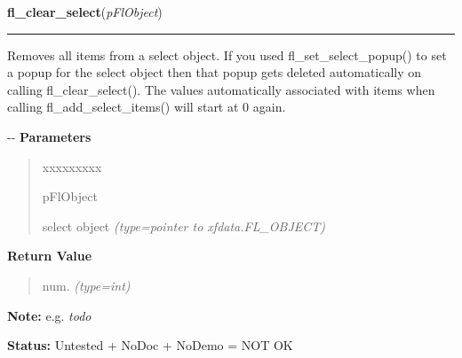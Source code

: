 \hspace{.8\funcindent}\begin{boxedminipage}{\funcwidth}

    \raggedright \textbf{fl\_clear\_select}(\textit{pFlObject})

    \vspace{-1.5ex}

    \rule{\textwidth}{0.5\fboxrule}
\setlength{\parskip}{2ex}

Removes all items from a select object. If you used
fl\_set\_select\_popup() to set a popup for the select object then that
popup gets deleted automatically on calling fl\_clear\_select(). The
values automatically associated with items when calling
fl\_add\_select\_items() will start at 0 again.

-{}-
\setlength{\parskip}{1ex}
      \textbf{Parameters}
      \vspace{-1ex}

      \begin{quote}
        \begin{Ventry}{xxxxxxxxx}

          \item[pFlObject]


select object
            {\it (type=pointer to xfdata.FL\_OBJECT)}

        \end{Ventry}

      \end{quote}

      \textbf{Return Value}
    \vspace{-1ex}

      \begin{quote}

num.
      {\it (type=int)}

      \end{quote}

\textbf{Note:} 
e.g. \emph{todo}


\textbf{Status:} 
Untested + NoDoc + NoDemo = NOT OK


    \end{boxedminipage}

    \label{xformslib:flselect:fl_add_select_items}

    \vspace{0.5ex}

